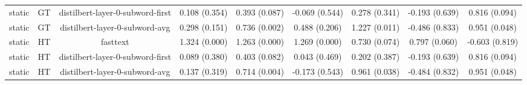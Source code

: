 \begin{sidewaystable}[htb]
\begin{tabular}{@{}ccccccccc@{}}
        static & GT & distilbert-layer-0-subword-first & 0.108 (0.354) & 0.393 (0.087) & -0.069 (0.544) & 0.278 (0.341) & -0.193 (0.639) & 0.816 (0.094) \\
        static & GT & distilbert-layer-0-subword-avg & 0.298 (0.151) & 0.736 (0.002) & 0.488 (0.206) & 1.227 (0.011) & -0.486 (0.833) & 0.951 (0.048) \\
        static & HT & fasttext & 1.324 (0.000) & 1.263 (0.000) & 1.269 (0.000) & 0.730 (0.074) & 0.797 (0.060) & -0.603 (0.819) \\
        static & HT & distilbert-layer-0-subword-first & 0.089 (0.380) & 0.403 (0.082) & 0.043 (0.469) & 0.202 (0.387) & -0.193 (0.639) & 0.816 (0.094) \\
        static & HT & distilbert-layer-0-subword-avg & 0.137 (0.319) & 0.714 (0.004) & -0.173 (0.543) & 0.961 (0.038) & -0.484 (0.832) & 0.951 (0.048) \\
        \bottomrule
    \end{tabular}
\end{sidewaystable}